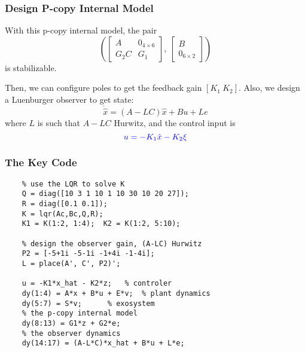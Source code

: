 \documentclass{beamer}
\begin{document}
\begin{frame}[fragile]
    \frametitle{{\color{red} Design P-copy Internal Model}}
With this p-copy internal model, the pair
\begin{equation}\label{control-pair}\nonumber
  \left(\left[\begin{matrix}
                A & 0_{4\times 6} \\
                G_{2}C & G_{1}
              \end{matrix}\right],~\left[\begin{matrix}
                                           B \\
                                           0_{6\times 2}
                                         \end{matrix}\right]\right)
\end{equation}
is stabilizable.

Then, we can configure poles to get the feedback gain $[K_{1}~ K_{2}]$.
Also, we design a Luenburger observer to get state:
\begin{equation}\label{observer}
  \dot{\hat{x}} = (A-LC)\hat{x}+Bu+Le
\end{equation}
where $L$ is such that $A-LC$ Hurwitz, and the control input is
$$
{\color{blue} u = -K_{1}\hat{x} - K_{2}\xi}
$$
\end{frame}


\begin{frame}[fragile]
    \frametitle{{\color{red} The Key Code}}
    \begin{lstlisting}
    % use the LQR to solve K
    Q = diag([10 3 1 10 1 10 30 10 20 27]);
    R = diag([0.1 0.1]);
    K = lqr(Ac,Bc,Q,R);
    K1 = K(1:2, 1:4);  K2 = K(1:2, 5:10);

    % design the observer gain, (A-LC) Hurwitz
    P2 = [-5+1i -5-1i -1+4i -1-4i];
    L = place(A', C', P2)';
    
    u = -K1*x_hat - K2*z;   % controler
    dy(1:4) = A*x + B*u + E*v;  % plant dynamics
    dy(5:7) = S*v;      % exosystem
    % the p-copy internal model
    dy(8:13) = G1*z + G2*e;
    % the observer dynamics
    dy(14:17) = (A-L*C)*x_hat + B*u + L*e;
    \end{lstlisting}
\end{frame}
\end{document}

